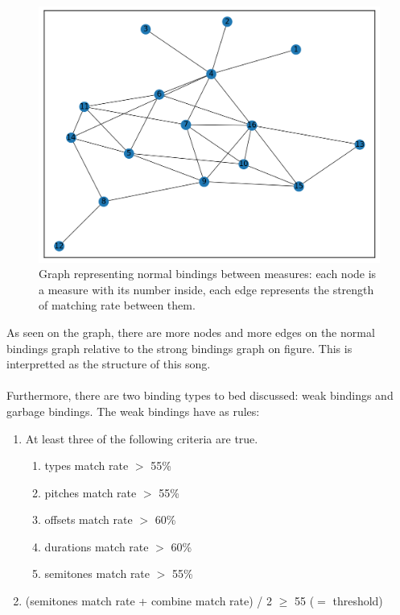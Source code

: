 \begin{figure}[H]
	\includegraphics[width=\linewidth]{Fotos/bindings_graph/Godfather_16_normal.png}
	\caption{Graph representing normal bindings between measures: each node is a measure with its number inside, each edge represents the strength of matching rate between them.}
	\label{fig:GF_normal_graph}
\end{figure}
As seen on the graph, there are more nodes and more edges on the normal bindings graph relative to the strong bindings graph on figure. This is interpretted as the structure of this song.
\\\\
Furthermore, there are two binding types to bed discussed: weak bindings and garbage bindings. The weak bindings have as rules:

\begin{enumerate}
	\item At least three of the following criteria are true.
			\begin{enumerate}
				\item types match rate $>$ 55\%
				\item pitches match rate $>$ 55\%
				\item offsets match rate $>$ 60\%
				\item durations match rate $>$ 60\%
				\item semitones match rate $>$ 55\%
			\end{enumerate}
	\item (semitones match rate + combine match rate) / 2 $\geq$ 55 ($=$ threshold)
\end{enumerate}


